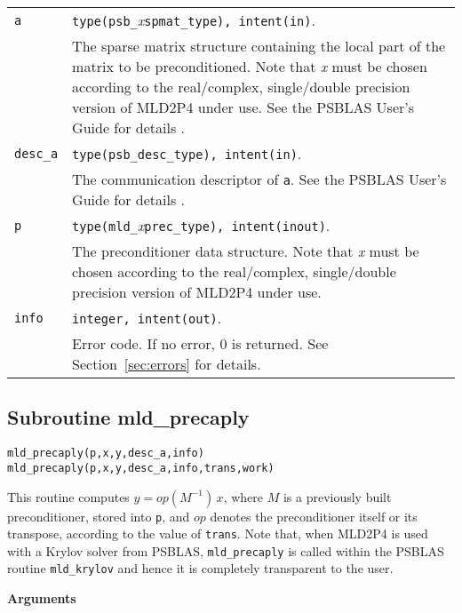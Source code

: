 \begin{tabular}{p{1.2cm}p{12cm}}
\verb|a|      & \verb|type(psb_|\emph{x}\verb|spmat_type), intent(in)|. \\
              & The sparse matrix structure containing the local part of the
                matrix to be preconditioned. Note that \emph{x} must be chosen according
                to the real/complex, 
single/double precision version of MLD2P4 under use.
                See the PSBLAS User's Guide for details \cite{PSBLASGUIDE}.\\
\verb|desc_a| & \verb|type(psb_desc_type), intent(in)|. \\
              & The communication descriptor of \verb|a|. See the PSBLAS User's Guide for
                details \cite{PSBLASGUIDE}.\\
\verb|p|      & \verb|type(mld_|\emph{x}\verb|prec_type), intent(inout)|.\\
              & The preconditioner data structure. Note that \emph{x} must be chosen according
                to the real/complex, single/double precision version of MLD2P4 under use.\\
\verb|info|   & \verb|integer, intent(out)|.\\
              & Error code. If no error, 0 is returned. See Section~\ref{sec:errors} for details.\\
\end{tabular}

\clearpage
\subsection{Subroutine mld\_precaply\label{sec:precaply}}

\begin{center}
\verb|mld_precaply(p,x,y,desc_a,info)|\\
\verb|mld_precaply(p,x,y,desc_a,info,trans,work)|\\
\end{center}

\noindent
This routine computes $y = op(M^{-1})\, x$, where $M$ is a previously built
preconditioner, stored into \verb|p|, and $op$
denotes the preconditioner itself or its transpose, according to
the value of \verb|trans|.
Note that, when MLD2P4 is used with a Krylov solver from PSBLAS,
\verb|mld_precaply| is called within the PSBLAS routine \verb|mld_krylov|
and hence it is completely transparent to the user.

{\baselineskip\noindent\large\bfseries Arguments}

